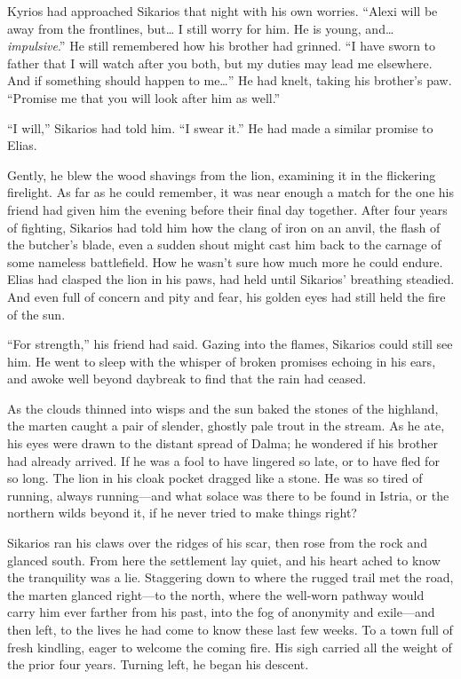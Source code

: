 Kyrios had approached Sikarios that night with his own worries. ``Alexi will be away from the frontlines, but\ldots{} I still worry for him. He is young, and\ldots{} \emph{impulsive}.'' He still remembered how his brother had grinned. ``I have sworn to father that I will watch after you both, but my duties may lead me elsewhere. And if something should happen to me\ldots'' He had knelt, taking his brother's paw. ``Promise me that you will look after him as well.''

``I will,'' Sikarios had told him. ``I swear it.'' He had made a similar promise to Elias.

Gently, he blew the wood shavings from the lion, examining it in the flickering firelight. As far as he could remember, it was near enough a match for the one his friend had given him the evening before their final day together. After four years of fighting, Sikarios had told him how the clang of iron on an anvil, the flash of the butcher's blade, even a sudden shout might cast him back to the carnage of some nameless battlefield. How he wasn't sure how much more he could endure. Elias had clasped the lion in his paws, had held until Sikarios' breathing steadied. And even full of concern and pity and fear, his golden eyes had still held the fire of the sun.

``For strength,'' his friend had said. Gazing into the flames, Sikarios could still see him. He went to sleep with the whisper of broken promises echoing in his ears, and awoke well beyond daybreak to find that the rain had ceased.

As the clouds thinned into wisps and the sun baked the stones of the highland, the marten caught a pair of slender, ghostly pale trout in the stream. As he ate, his eyes were drawn to the distant spread of Dalma; he wondered if his brother had already arrived. If he was a fool to have lingered so late, or to have fled for so long. The lion in his cloak pocket dragged like a stone. He was so tired of running, always running---and what solace was there to be found in Istria, or the northern wilds beyond it, if he never tried to make things right?

Sikarios ran his claws over the ridges of his scar, then rose from the rock and glanced south. From here the settlement lay quiet, and his heart ached to know the tranquility was a lie. Staggering down to where the rugged trail met the road, the marten glanced right---to the north, where the well-worn pathway would carry him ever farther from his past, into the fog of anonymity and exile---and then left, to the lives he had come to know these last few weeks. To a town full of fresh kindling, eager to welcome the coming fire. His sigh carried all the weight of the prior four years. Turning left, he began his descent.

